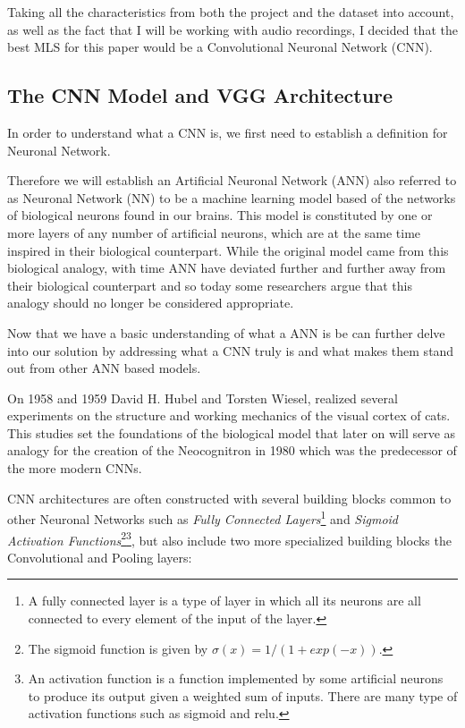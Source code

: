 \documentclass[12pt, a4paper]{article}
\begin{document}
	Taking all the characteristics from both the project and the dataset into account, as well as the fact that I will be working with audio recordings, I decided that the best MLS for this paper would be a Convolutional Neuronal Network (CNN).
	
	\clearpage
	
	\subsection{The CNN Model and VGG Architecture}
	
	In order to understand what a CNN is, we first need to establish a definition for Neuronal Network. 
	
	Therefore we will establish an Artificial Neuronal Network (ANN) also referred to as Neuronal Network (NN) to be a machine learning model based of the networks of biological neurons found in our brains. This model is constituted by one or more layers of any number of artificial neurons, which are at the same time inspired in their biological counterpart. While the original model came from this biological analogy, with time ANN have deviated further and further away from their biological counterpart and so today some researchers argue that this analogy should no longer be considered appropriate.
	
	Now that we have a basic understanding of what a ANN is be can further delve into our solution by addressing what a CNN truly is and what makes them stand out from other ANN based models.
	
	On 1958\cite{cortex58} and 1959\cite{cortex59} David H. Hubel and Torsten Wiesel, realized several experiments on the structure and working mechanics of the visual cortex of cats. This studies set the foundations of the biological model that later on will serve as analogy for the creation of the Neocognitron\cite{neocognitron} in 1980 which was the predecessor of the more modern CNNs.
	
	CNN architectures are often constructed with several building blocks common to other Neuronal Networks such as \textit{Fully Connected Layers}\footnote{A fully connected layer is a type of layer in which all its neurons are all connected to every element of the input of the layer.} and \textit{Sigmoid Activation Functions}\footnote{The sigmoid function is given by $\sigma(x) = 1/(1+exp(-x))$.}\footnote{An activation function is a function implemented by some artificial neurons to produce its output given a weighted sum of inputs. There are many type of activation functions such as sigmoid and relu. }, but also include two more specialized building blocks the Convolutional and Pooling layers:
	
\end{document}
